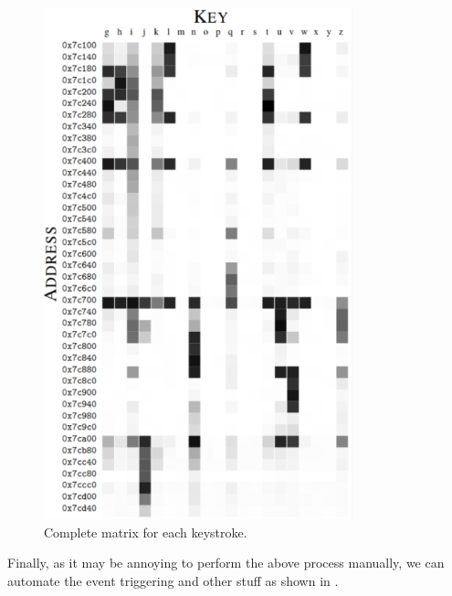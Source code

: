 \begin{figure}[!ht]
    \centering
    \includegraphics[width=0.8\textwidth]{images/chapter_6/cache-keymap-matrix.png}
    \caption{Complete matrix for each keystroke.}
    \label{fig:cache-keymap-matrix}
\end{figure}

Finally, as it may be annoying to perform the above process manually, we can automate the event triggering and other stuff as shown in \cite{GitGruss}.